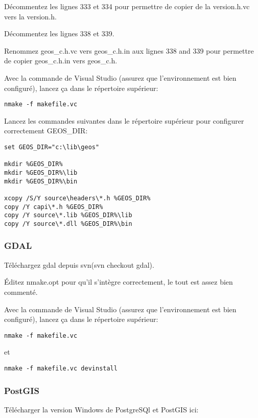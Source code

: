 D\'ecommentez les lignes 333 et 334 pour permettre de copier de la version.h.vc vers la version.h.

D\'ecommentez les lignes 338 et 339.

Renommez geos\_c.h.vc vers geos\_c.h.in aux lignes 338 and 339 pour permettre de copier geos\_c.h.in vers geos\_c.h.

Avec la commande de Visual Studio (assurez que l'environnement est bien configur\'e), lancez \c{c}a dans le r\'epertoire sup\'erieur:

\begin{verbatim}
nmake -f makefile.vc 
\end{verbatim}

Lancez les commandes suivantes dans le r\'epertoire sup\'erieur pour configurer correctement GEOS\_DIR:

\begin{verbatim}
set GEOS_DIR="c:\lib\geos"

mkdir %GEOS_DIR%
mkdir %GEOS_DIR%\lib
mkdir %GEOS_DIR%\bin

xcopy /S/Y source\headers\*.h %GEOS_DIR%
copy /Y capi\*.h %GEOS_DIR%
copy /Y source\*.lib %GEOS_DIR%\lib
copy /Y source\*.dll %GEOS_DIR%\bin
\end{verbatim}

\subsubsection{GDAL}
T\'el\'echargez gdal depuis svn(svn checkout  gdal).

\'Editez nmake.opt pour qu'il s'int\`egre correctement, le tout est assez bien comment\'e.

Avec la commande de Visual Studio (assurez que l'environnement est bien configur\'e), lancez \c{c}a dans le r\'epertoire sup\'erieur:

\begin{verbatim}
nmake -f makefile.vc 
\end{verbatim}

et

\begin{verbatim}
nmake -f makefile.vc devinstall 
\end{verbatim}

\subsubsection{PostGIS}
T\'el\'echarger la version Windows de PostgreSQl et PostGIS ici:

